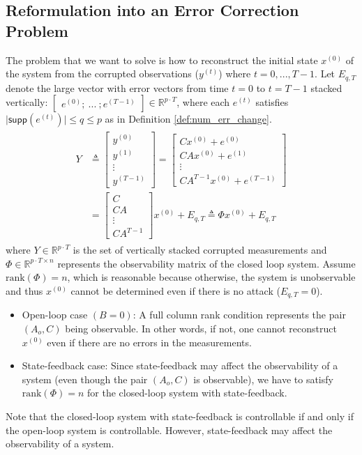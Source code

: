 \documentclass[journal]{IEEEtran}
\begin{document}
\subsection{Reformulation into an Error Correction Problem} \label{sec:err_corr}
The problem that we want to solve is how to reconstruct the initial state $x^{(0)}$ of the system from the corrupted observations ($y^{(t)}$) where $t=0,...,T-1$.
Let $E_{q,T}$ denote the large vector with error vectors from time $t=0$ to $t=T-1$ stacked vertically: $\begin{bmatrix} e^{(0)}; ~ ...~  ;  e^{(T-1)} \end{bmatrix}   \in  \mathbb{R}^{p\cdot T} $, where each $e^{(t)}$ satisfies $\lvert \textsf{supp}(e^{(t)}) \rvert \le q \le p $ as in Definition \ref{def:num_err_change}. 
\begin{eqnarray} \label{eq:sys_err_corr}
\begin{aligned}
	Y &\triangleq \begin{bmatrix} y^{(0)} \\ y^{(1)} \\ \vdots \\ y^{(T-1)} \end{bmatrix} 
		= \begin{bmatrix} Cx^{(0)} + e^{(0)} \\ CA x^{(0)} + e^{(1)} \\ \vdots \\ CA^{T-1} x^{(0)} + e^{(T-1)} \end{bmatrix} \\
		& =
		\begin{bmatrix} C \\ CA \\ \vdots \\ CA^{T-1} \end{bmatrix} x^{(0)} + E_{q,T} \triangleq \Phi x^{(0)} + E_{q,T}
		\label{eq:decoder_Phi}
\end{aligned}
\end{eqnarray}
where $Y \in \mathbb{R}^{p\cdot T}$ is the set of vertically stacked corrupted measurements and $\Phi \in \mathbb{R}^{p\cdot T \times n}$ represents the observability matrix of the closed loop system. Assume $\text{rank}(\Phi) = n$, which is reasonable because otherwise, the system is unobservable and thus $x^{(0)}$ cannot be determined even if there is no attack ($E_{q,T} = 0$).
\begin{itemize}
\item Open-loop case $(B=0)$:  A full column rank condition represents the pair $(A_o,C)$ being observable. In other words, if not, one cannot reconstruct $x^{(0)}$ even if there are no errors in the measurements.
\item State-feedback case: Since state-feedback may affect the observability of a system (even though the pair $(A_o,C)$ is observable), we have to satisfy $\text{rank}(\Phi) = n$ for the closed-loop system with state-feedback. \end{itemize}
Note that the closed-loop system with state-feedback is controllable if and only if the open-loop system is controllable. However, state-feedback may affect the observability of a system. 
\end{document}
